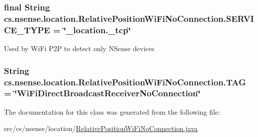 \hypertarget{classcs_1_1nsense_1_1location_1_1_relative_position_wi_fi_no_connection_aaba705c3a023dc1e728a8e85bf1956cf}{
\subsubsection[{S\-E\-R\-V\-I\-C\-E\-\_\-\-T\-Y\-P\-E}]{\setlength{\rightskip}{0pt plus 5cm}final String cs.\-nsense.\-location.\-Relative\-Position\-Wi\-Fi\-No\-Connection.\-S\-E\-R\-V\-I\-C\-E\-\_\-\-T\-Y\-P\-E = \char`\"{}\-\_\-location.\-\_\-tcp\char`\"{}\hspace{0.3cm}{\ttfamily [static]}}}\label{classcs_1_1nsense_1_1location_1_1_relative_position_wi_fi_no_connection_aaba705c3a023dc1e728a8e85bf1956cf}
Used by Wi\-Fi P2\-P to detect only N\-Sense devices \hypertarget{classcs_1_1nsense_1_1location_1_1_relative_position_wi_fi_no_connection_a82d5b0f8acf6eb34df38822886fa6837}{
\subsubsection[{T\-A\-G}]{\setlength{\rightskip}{0pt plus 5cm}String cs.\-nsense.\-location.\-Relative\-Position\-Wi\-Fi\-No\-Connection.\-T\-A\-G = \char`\"{}Wi\-Fi\-Direct\-Broadcast\-Receiver\-No\-Connection\char`\"{}\hspace{0.3cm}{\ttfamily [private]}}}\label{classcs_1_1nsense_1_1location_1_1_relative_position_wi_fi_no_connection_a82d5b0f8acf6eb34df38822886fa6837}


The documentation for this class was generated from the following file\-:\begin{DoxyCompactItemize}
\item 
src/cs/nsense/location/\hyperlink{_relative_position_wi_fi_no_connection_8java}{Relative\-Position\-Wi\-Fi\-No\-Connection.\-java}\end{DoxyCompactItemize}
